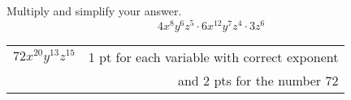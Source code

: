 
{
	Multiply and simplify your answer. 
	$$4x^8 y^6 z^5 \cdot 6x^{12} y^{7} z^4\cdot 3z^6$$
}
{
	\begin{tabular}{l r}
	$72 x^{20} y^{13}z^{15}$ & 1 pt for each variable with correct exponent\\ & and 2 pts for the number 72
	\end{tabular}
}
